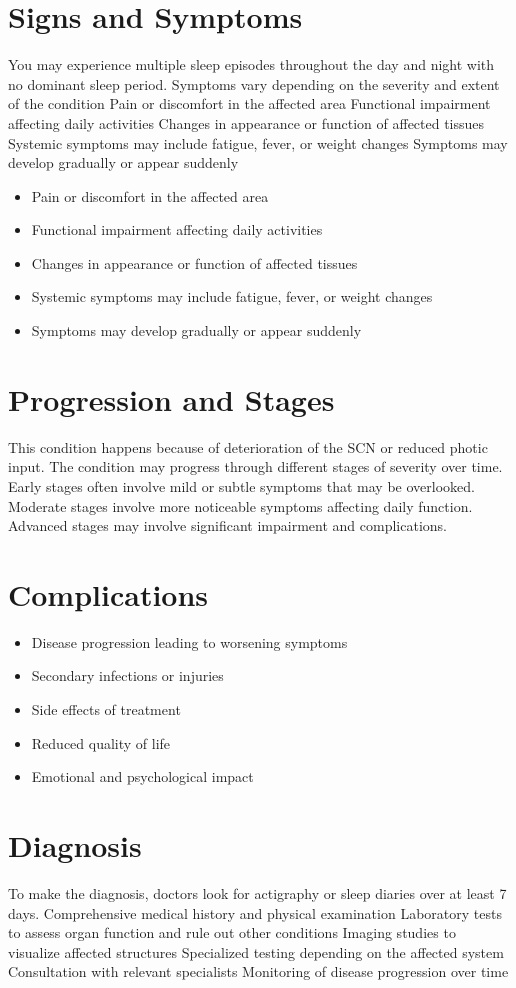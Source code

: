 \section{Signs and Symptoms}
You may experience multiple sleep episodes throughout the day and night with no dominant sleep period. Symptoms vary depending on the severity and extent of the condition Pain or discomfort in the affected area Functional impairment affecting daily activities Changes in appearance or function of affected tissues Systemic symptoms may include fatigue, fever, or weight changes Symptoms may develop gradually or appear suddenly

\begin{itemize}[noitemsep]
  \item Pain or discomfort in the affected area
  \item Functional impairment affecting daily activities
  \item Changes in appearance or function of affected tissues
  \item Systemic symptoms may include fatigue, fever, or weight changes
  \item Symptoms may develop gradually or appear suddenly
\end{itemize}
\section{Progression and Stages}
This condition happens because of deterioration of the SCN or reduced photic input. The condition may progress through different stages of severity over time. Early stages often involve mild or subtle symptoms that may be overlooked. Moderate stages involve more noticeable symptoms affecting daily function. Advanced stages may involve significant impairment and complications.
\section{Complications}
\begin{itemize}[noitemsep]
  \item Disease progression leading to worsening symptoms
  \item Secondary infections or injuries
  \item Side effects of treatment
  \item Reduced quality of life
  \item Emotional and psychological impact
\end{itemize}
\section{Diagnosis}
To make the diagnosis, doctors look for actigraphy or sleep diaries over at least 7 days. Comprehensive medical history and physical examination Laboratory tests to assess organ function and rule out other conditions Imaging studies to visualize affected structures Specialized testing depending on the affected system Consultation with relevant specialists Monitoring of disease progression over time


